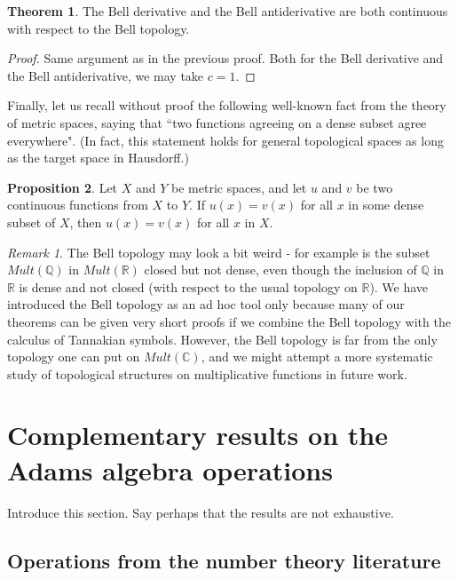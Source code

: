 \documentclass[a4paper]{article}
\theoremstyle{definition}
\newtheorem{theorem}{Theorem}[section]
\newtheorem{proposition}[theorem]{Proposition}
\theoremstyle{remark}
\newtheorem*{remark}{Remark}
\newcommand{\Q}{\mathbb{Q}}
\newcommand{\C}{\mathbb{C}}
\begin{document}
\begin{theorem} \label{BellDerivativeContinuity}
The Bell derivative and the Bell antiderivative are both continuous with respect to the Bell topology.
\end{theorem}
\begin{proof}
Same argument as in the previous proof. Both for the Bell derivative and the Bell antiderivative, we may take $c=1$. 
\end{proof}

Finally, let us recall without proof the following well-known fact from the theory of metric spaces, saying that ``two functions agreeing on a dense subset agree everywhere". (In fact, this statement holds for general topological spaces as long as the target space in Hausdorff.)

\begin{proposition}
Let $X$ and $Y$ be metric spaces, and let $u$ and $v$ be two continuous functions from $X$ to $Y$. If $u(x) = v(x)$ for all $x$ in some dense subset of $X$, then $u(x) = v(x)$ for all $x$ in $X$.  
\end{proposition}

\begin{remark}
The Bell topology may look a bit weird - for example is the subset $Mult(\Q)$ in $Mult(\mathbb{R})$ closed but not dense, even though the inclusion of $\Q$ in $\mathbb{R}$ is dense and not closed (with respect to the usual topology on $\mathbb{R}$). We have introduced the Bell topology as an ad hoc tool only because many of our theorems can be given very short proofs if we combine the Bell topology with the calculus of Tannakian symbols. However, the Bell topology is far from the only topology one can put on $Mult(\C)$, and we might attempt a more systematic study of topological structures on multiplicative functions in future work. 
\end{remark}




\section{Complementary results on the Adams algebra operations}  \label{sec:Complementary}

Introduce this section. Say perhaps that the results are not exhaustive.

\subsection{Operations from the number theory literature}
\end{document}
